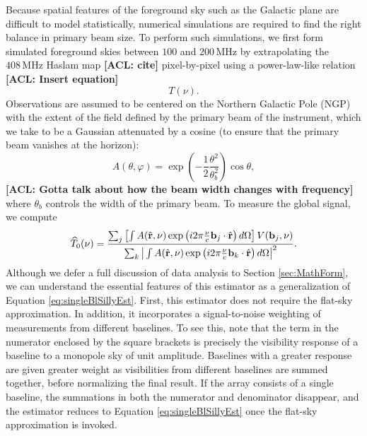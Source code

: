 \documentclass[twolcolumn,apj,iop,numberedappendix]{emulateapj}
\newcommand{\rhat}{\hat{\mathbf{r}}}
\newcommand{\acl}[1]{{\color{red} \textbf{[ACL:  #1]}}}
\begin{document}
Because spatial features of the foreground sky such as the Galactic plane are difficult to model statistically, numerical simulations are required to find the right balance in primary beam size. To perform such simulations, we first form simulated foreground skies between $100$ and $200\,\textrm{MHz}$ by extrapolating the $408\,\textrm{MHz}$ Haslam map \acl{cite} pixel-by-pixel using a power-law-like relation \acl{Insert equation}
\begin{equation}
\label{sec:HaslamExtrap}
T(\nu).
\end{equation}
Observations are assumed to be centered on the Northern Galactic Pole (NGP) with the extent of the field defined by the primary beam of the instrument, which we take to be a Gaussian attenuated by a cosine (to ensure that the primary beam vanishes at the horizon):
\begin{equation}
\label{eq:TaperedGauss}
A(\theta, \varphi) = \exp \left( -\frac{1}{2} \frac{\theta^2}{\theta_b^2} \right) \cos \theta,
\end{equation}
\acl{Gotta talk about how the beam width changes with frequency}
where $\theta_b$ controls the width of the primary beam. To measure the global signal, we compute
\begin{equation}
\label{eq:NormedSimpleEst}
\widehat{T}_0 (\nu) = \frac{ \sum_j \left[ \int  A(\rhat, \nu) \exp\left(i 2\pi \frac{\nu }{c}\mathbf{b}_j \cdot \rhat \right)d\Omega \right] V(\mathbf{b}_j, \nu)}{ \sum_k \big{|} \int  A(\rhat, \nu) \exp\left(i 2\pi \frac{\nu }{c}\mathbf{b}_k \cdot \rhat \right)d\Omega \big{|}^2}.
\end{equation}
Although we defer a full discussion of data analysis to Section \ref{sec:MathForm}, we can understand the essential features of this estimator as a generalization of Equation \eqref{eq:singleBlSillyEst}. First, this estimator does not require the flat-sky approximation. In addition, it incorporates a signal-to-noise weighting of measurements from different baselines. To see this, note that the term in the numerator enclosed by the square brackets is precisely the visibility response of a baseline to a monopole sky of unit amplitude. Baselines with a greater response are given greater weight as visibilities from different baselines are summed together, before normalizing the final result. If the array consists of a single baseline, the summations in both the numerator and denominator disappear, and the estimator reduces to Equation \eqref{eq:singleBlSillyEst} once the flat-sky approximation is invoked.
\end{document}
